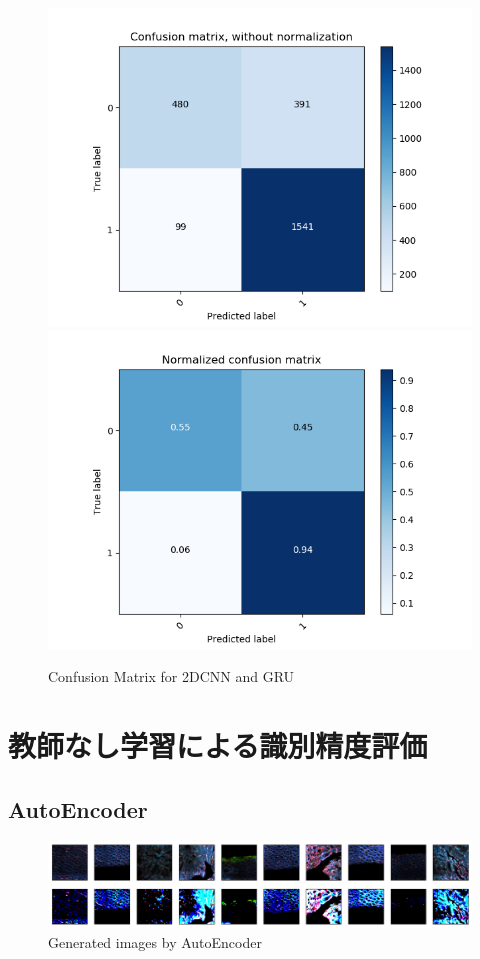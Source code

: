 \begin{figure}[H]
	\begin{minipage}[b]{\columnwidth}
		\centering
		\includegraphics[clip, width=0.45\linewidth]{fig/chapter4/3d/confusion_matrix/count_confusion_matrix_False_100_gru}
		\includegraphics[clip, width=0.45\linewidth]{fig/chapter4/3d/confusion_matrix/normalized_confusion_matrix_False_100_gru}
		\label{fig:}
	\end{minipage}
	
	\caption{Confusion Matrix for 2DCNN and GRU}
	\label{fig:gru_matrix}
	
\end{figure}



\section{教師なし学習による識別精度評価}

\subsection{AutoEncoder}

\begin{figure}[H]
	\centering
	\includegraphics[width=\linewidth]{fig/chapter4/unet_ae}
	\caption{Generated images by AutoEncoder}
	\label{fig:unetae}
\end{figure}


